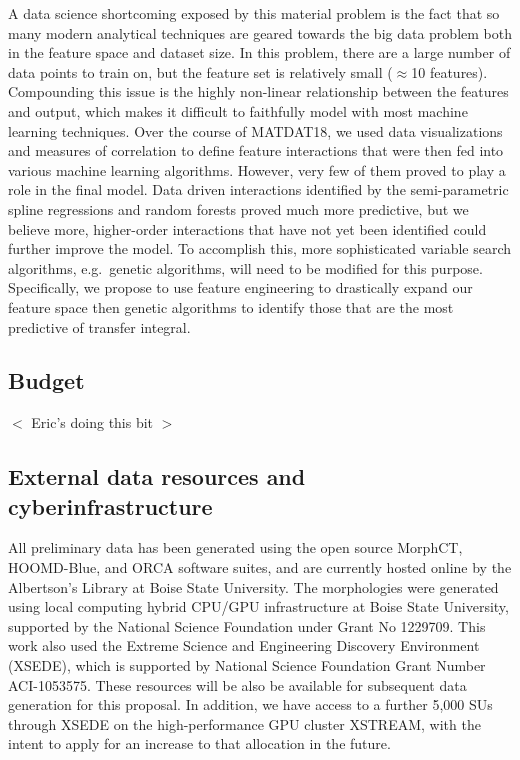 \documentclass[12pt]{article}
\begin{document}
A data science shortcoming exposed by this material problem is the fact that so many modern analytical techniques are geared towards the big data problem both in the feature space and dataset size.
In this problem, there are a large number of data points to train on, but the feature set is relatively small ($\approx$10 features).
Compounding this issue is the highly non-linear relationship between the features and output, which makes it difficult to faithfully model with most machine learning techniques.
Over the course of MATDAT18, we used data visualizations and measures of correlation to define feature interactions that were then fed into various machine learning algorithms.
However, very few of them proved to play a role in the final model.
Data driven interactions identified by the semi-parametric spline regressions and random forests proved much more predictive, but we believe more, higher-order interactions that have not yet been identified could further improve the model.
To accomplish this, more sophisticated variable search algorithms, e.g.~genetic algorithms, will need to be modified for this purpose.
Specifically, we propose to use feature engineering to drastically expand our feature space then genetic algorithms to identify those that are the most predictive of transfer integral.


\subsection{Budget}

$<$ Eric's doing this bit $>$


\subsection{External data resources and cyberinfrastructure}

All preliminary data has been generated using the open source MorphCT\cite{Jones2017}, HOOMD-Blue\cite{Anderson08}, and ORCA\cite{Neese2012b} software suites, and are currently hosted online by the Albertson's Library at Boise State University\cite{MatDat18Data}.
The morphologies were generated using local computing hybrid CPU/GPU infrastructure at Boise State University, supported by the National Science Foundation under Grant No 1229709.
This work also used the Extreme Science and Engineering Discovery Environment (XSEDE), which is supported by National Science Foundation Grant Number ACI-1053575.
These resources will be also be available for subsequent data generation for this proposal.
In addition, we have access to a further 5,000 SUs through XSEDE on the high-performance GPU cluster XSTREAM, with the intent to apply for an increase to that allocation in the future.

\newpage




\end{document}
